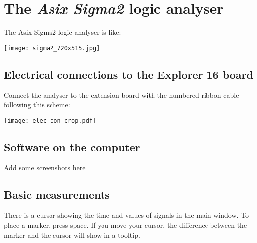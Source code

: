 \documentclass[10pt,a4paper]{article}
\theoremstyle{definition}%
\begin{document}
\appendix
\section{The \textit{Asix Sigma2} logic analyser}
The Asix Sigma2 logic analyser is like:\\ 
\label{ap:la}
\begin{center}
\texttt{[image: sigma2\_720x515.jpg]}
\end{center}
\subsection{Electrical connections to the Explorer 16 board}
Connect the analyser to the extension board with the numbered ribbon cable following this scheme:
\begin{center}
\texttt{[image: elec\_con-crop.pdf]}
\end{center}
\subsection{Software on the computer}

Add some screenshots here

\subsection{Basic measurements}
There is a cursor showing the time and values of signals in the main window. To place a marker, press space. If you move your cursor, the difference between the marker and the cursor will show in a tooltip.
\end{document}
